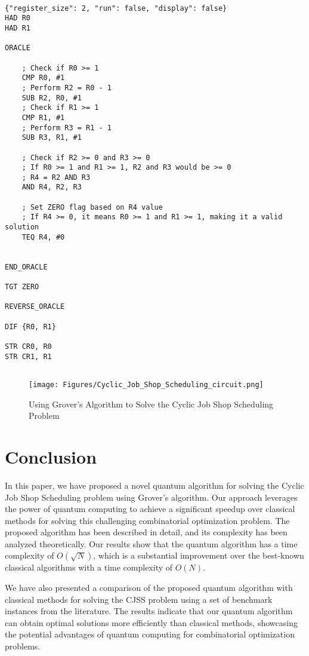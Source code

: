 \begin{lstlisting}

{"register_size": 2, "run": false, "display": false}
HAD R0
HAD R1

ORACLE

    ; Check if R0 >= 1
    CMP R0, #1
    ; Perform R2 = R0 - 1
    SUB R2, R0, #1
    ; Check if R1 >= 1
    CMP R1, #1
    ; Perform R3 = R1 - 1
    SUB R3, R1, #1

    ; Check if R2 >= 0 and R3 >= 0
    ; If R0 >= 1 and R1 >= 1, R2 and R3 would be >= 0
    ; R4 = R2 AND R3
    AND R4, R2, R3

    ; Set ZERO flag based on R4 value
    ; If R4 >= 0, it means R0 >= 1 and R1 >= 1, making it a valid solution
    TEQ R4, #0


END_ORACLE

TGT ZERO

REVERSE_ORACLE

DIF {R0, R1}

STR CR0, R0
STR CR1, R1


\end{lstlisting}

\begin{figure}[htp]
    \centering
    \texttt{[image: Figures/Cyclic\_Job\_Shop\_Scheduling\_circuit.png]}
    \caption{Using Grover's Algorithm to Solve the Cyclic Job Shop Scheduling Problem}
    \label{fig:Cyclic_Job_Shop_Scheduling}
\end{figure}

\section{Conclusion}

In this paper, we have proposed a novel quantum algorithm for solving the Cyclic Job Shop Scheduling problem using Grover's algorithm. Our approach leverages the power of quantum computing to achieve a significant speedup over classical methods for solving this challenging combinatorial optimization problem. The proposed algorithm has been described in detail, and its complexity has been analyzed theoretically. Our results show that the quantum algorithm has a time complexity of $O(\sqrt{N})$, which is a substantial improvement over the best-known classical algorithms with a time complexity of $O(N)$.

We have also presented a comparison of the proposed quantum algorithm with classical methods for solving the CJSS problem using a set of benchmark instances from the literature. The results indicate that our quantum algorithm can obtain optimal solutions more efficiently than classical methods, showcasing the potential advantages of quantum computing for combinatorial optimization problems.

